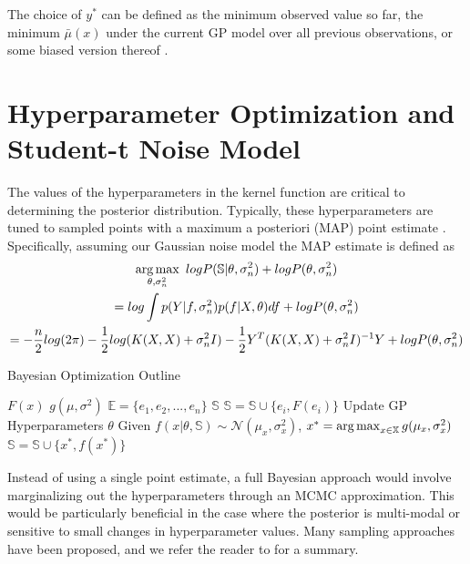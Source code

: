 The choice of $y^*$ can be defined as the minimum observed value so far, the minimum $\bar{\mu}(x)$ under the current GP model over all previous observations, or some biased version thereof \citep{Lizotte:2008:PBO:1626686}. 

\section{Hyperparameter Optimization and Student-t Noise Model}
\label{gp_hyperparam}
The values of the hyperparameters in the kernel function are critical to determining the posterior distribution. Typically, these hyperparameters are tuned to sampled points with a maximum a posteriori (MAP) point estimate \citep{NIPS2012_4522,GPstuff}. Specifically, assuming our Gaussian noise model the MAP estimate is defined as
\begin{gather}
\operatorname*{arg\,max}_{\theta, \sigma_n^2} \text{ } log P(\mathbb{S}\vert \theta, \sigma_n^2) + log P(\theta, \sigma_n^2)\\
=log \int p(Y\vert f, \sigma_n^2)p(f\vert X,\theta)df + log P(\theta, \sigma_n^2)\nonumber\\
= -\frac{n}{2}log(2\pi) - \frac{1}{2}log(K(X,X) + \sigma_n^2 I) - \frac{1}{2}Y^T(K(X,X) + \sigma_n^2 I)^{-1}Y + log P(\theta, \sigma_n^2)\nonumber
\end{gather}


\begin{algorithm}[t]
\caption{Bayesian Optimization Outline}
\label{alg:bayesopt}
\begin{algorithmic}
\State {} $F(x)$
\State {} $g(\mu, \sigma^2)$
\State {} $\mathbb{E} = \{e_1, e_2, ..., e_n\}$
\State {} $\mathbb{S}$
  \State $\mathbb{S} = \mathbb{S} \cup \{e_i, F(e_i)\}$
\End
{}
  \State Update GP Hyperparameters $\theta$
  \State Given $f(x\vert \theta, \mathbb{S}) \sim \mathcal{N}(\mu_x, \sigma_x^2)$,
  \State $x^* = \operatorname*{arg\,max}_{x \in \mathbb{X}} g(\mu_x, \sigma_x^2)$
  \State $\mathbb{S} = \mathbb{S} \cup \{x^*, f(x^*)\}$
\End
\end{algorithmic}
\end{algorithm}


Instead of using a single point estimate, a full Bayesian approach would involve marginalizing out the hyperparameters through an MCMC approximation. This would be particularly beneficial in the case where the posterior is multi-modal or sensitive to small changes in hyperparameter values. Many sampling approaches have been proposed, and we refer the reader to \cite[Chapter~14]{barber2011bayesian} for a summary. 

